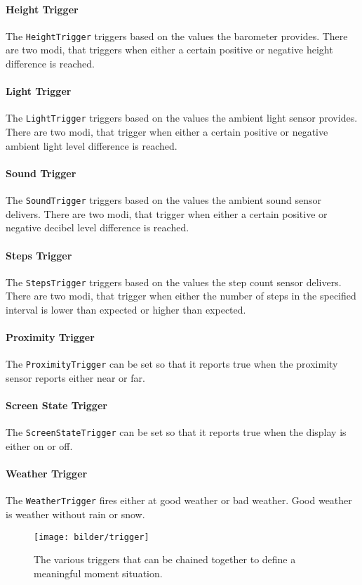 \documentclass[a4paper]{report}
\begin{document}
\paragraph{Height Trigger} The \texttt{HeightTrigger} triggers based on the values the barometer provides. There are two modi, that triggers when either a certain positive or negative height difference is reached.
\paragraph{Light Trigger} The \texttt{LightTrigger} triggers based on the values the ambient light sensor provides. There are two modi, that trigger when either a certain positive or negative ambient light level difference is reached.
\paragraph{Sound Trigger} The \texttt{SoundTrigger} triggers based on the values the ambient sound sensor delivers. There are two modi, that trigger when either a certain positive or negative decibel level difference is reached.
\paragraph{Steps Trigger} The \texttt{StepsTrigger} triggers based on the values the step count sensor delivers. There are two modi, that trigger when either the number of steps in the specified interval is lower than expected or higher than expected.
\paragraph{Proximity Trigger} The \texttt{ProximityTrigger} can be set so that it reports true when the proximity sensor reports either near or far.
\paragraph{Screen State Trigger} The \texttt{ScreenStateTrigger}  can be set so that it reports true when the display is either on or off.
\paragraph{Weather Trigger} The \texttt{WeatherTrigger} fires either at good weather or bad weather. Good weather is weather without rain or snow.
\begin{figure}[h!]
  \centering
  \texttt{[image: bilder/trigger]}
  \caption{The various triggers that can be chained together to define a meaningful moment situation. \label{triggerfig}}
\end{figure}
\end{document}

